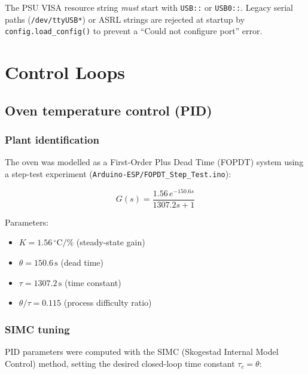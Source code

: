 \documentclass[12pt, a4paper]{report}
\begin{document}
\begin{warningbox}
The PSU VISA resource string \emph{must} start with \texttt{USB::} or \texttt{USB0::}.
Legacy serial paths (\texttt{/dev/ttyUSB*}) or ASRL strings are rejected at startup by
\texttt{config.load\_config()} to prevent a ``Could not configure port'' error.
\end{warningbox}

\chapter{Control Loops}
\label{ch:control}

\section{Oven temperature control (PID)}

\subsection{Plant identification}

The oven was modelled as a First-Order Plus Dead Time (FOPDT) system using a
step-test experiment (\texttt{Arduino-ESP/FOPDT\_Step\_Test.ino}):

\begin{equation}
  G(s) = \frac{1.56\,e^{-150.6s}}{1307.2s + 1}
  \label{eq:fopdt}
\end{equation}

Parameters:
\begin{itemize}
  \item $K = 1.56\,^\circ\text{C}/\%$ (steady-state gain)
  \item $\theta = 150.6\,\text{s}$ (dead time)
  \item $\tau = 1307.2\,\text{s}$ (time constant)
  \item $\theta/\tau = 0.115$ (process difficulty ratio)
\end{itemize}

\subsection{SIMC tuning}

PID parameters were computed with the SIMC (Skogestad Internal Model Control)
method, setting the desired closed-loop time constant $\tau_c = \theta$:
\end{document}
